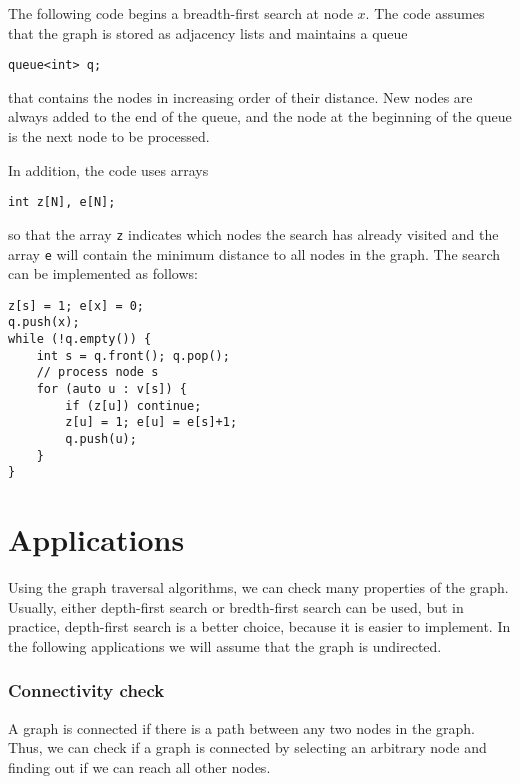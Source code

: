The following code begins a breadth-first
search at node $x$.
The code assumes that the graph is stored
as adjacency lists and maintains a queue
\begin{lstlisting}
queue<int> q;
\end{lstlisting}
that contains the nodes in increasing order
of their distance.
New nodes are always added to the end
of the queue, and the node at the beginning
of the queue is the next node to be processed.

In addition, the code uses arrays
\begin{lstlisting}
int z[N], e[N];
\end{lstlisting}
so that the array \texttt{z} indicates
which nodes the search has already visited
and the array \texttt{e} will contain the
minimum distance to all nodes in the graph.
The search can be implemented as follows:
\begin{lstlisting}
z[s] = 1; e[x] = 0;
q.push(x);
while (!q.empty()) {
    int s = q.front(); q.pop();
    // process node s
    for (auto u : v[s]) {
        if (z[u]) continue;
        z[u] = 1; e[u] = e[s]+1;
        q.push(u);
    }
}
\end{lstlisting}

\section{Applications}

Using the graph traversal algorithms,
we can check many properties of the graph.
Usually, either depth-first search or
bredth-first search can be used,
but in practice, depth-first search
is a better choice, because it is
easier to implement.
In the following applications we will
assume that the graph is undirected.

\subsubsection{Connectivity check}


A graph is connected if there is a path
between any two nodes in the graph.
Thus, we can check if a graph is connected
by selecting an arbitrary node and
finding out if we can reach all other nodes.

